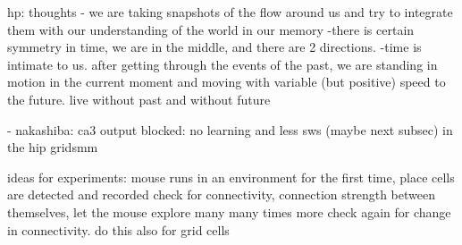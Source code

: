   hp: thoughts
  - we are taking snapshots of the flow around us and try to integrate them with our
  understanding of the world in our memory
  -there is certain symmetry in time, we are in the middle, and there are 2 directions.
  -time is intimate to us. after getting through the events of the past, we are
  standing in motion in the current moment and moving with variable (but
  positive) speed to the future.
  live without past and without future

  - nakashiba: ca3 output blocked: no learning and less sws (maybe next subsec)
  in the hip
  gridsmm

  ideas for experiments:
  mouse runs in an environment for the first time, place cells are detected and recorded
  check for connectivity, connection strength between themselves, let the mouse explore many many times more
  check again for change in connectivity.
  do this also for grid cells





